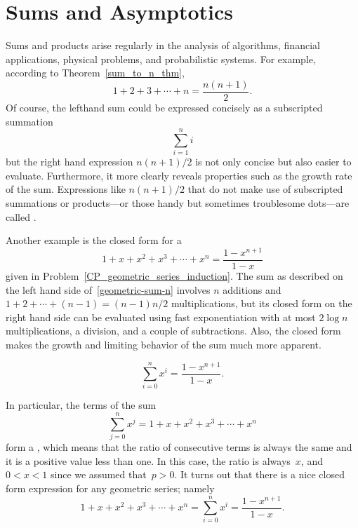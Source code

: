 \chapter{Sums and Asymptotics}\label{chap:asymptotics}

Sums and products arise regularly in the analysis of algorithms,
financial applications, physical problems, and probabilistic systems.
For example, according to Theorem~\ref{sum_to_n_thm},
\begin{equation}\label{sum1n_closedform}
1 + 2 + 3 +\cdots + n = \frac{n(n+1)}{2}.
\end{equation}
Of course, the lefthand sum could be expressed concisely as a
subscripted summation
\[
\sum_{i=1}^n i
\]
but the right hand expression $n(n+1)/2$ is not only concise but also
easier to evaluate.  Furthermore, it more clearly reveals properties
such as the growth rate of the sum.  Expressions like $n(n+1)/2$ that
do not make use of subscripted summations or products---or those
handy but sometimes troublesome dots---are called .

Another example is the closed form for a 
\begin{equation}\label{geometric-sum-n}
1 + x + x^2 + x^3 + \cdots + x^{n} = \frac{1 - x^{n+1}}{1 - x}
\end{equation}
given in Problem~\ref{CP_geometric_series_induction}.  The sum as
described on the left hand side of~\eqref{geometric-sum-n} involves
$n$ additions and $1 + 2 + \cdots + (n-1) = (n-1)n/2$ multiplications,
but its closed form on the right hand side can be evaluated using fast
exponentiation with at most $2 \log n$ multiplications, a division,
and a couple of subtractions.  Also, the closed form makes the growth
and limiting behavior of the sum much more apparent.

\iffalse

\begin{equation}\label{geometric-sum-n-1}
    \sum_{i = 0}^{n} x^i = \frac{1 - x^{n+1}}{1 - x}.
\end{equation}

In particular, the terms of the sum
\[
    \sum_{j = 0}^{n} x^j = 1 + x + x^2 + x^3 + \cdots + x^{n}
\]
form a , which means that the ratio of
consecutive terms is always the same and it is a positive value less
than one.  In this case, the ratio is always~$x$, and $0 < x < 1$
since we assumed that~$p > 0$.  It turns out that there is a nice
closed form expression for any geometric series; namely
\begin{equation}\label{geometric-sum-n-1}
1 + x + x^2 + x^3 + \cdots + x^{n} = \sum_{i = 0}^{n} x^i = \frac{1 - x^{n+1}}{1 - x}.
\end{equation}

